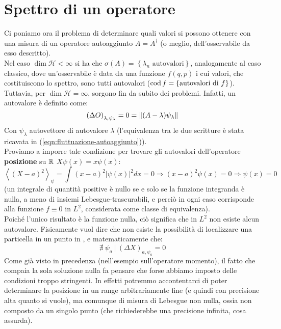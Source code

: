 \documentclass[../../FisicaTeorica.tex]{subfiles}
\begin{document}
\section{Spettro di un operatore}
Ci poniamo ora il problema di determinare quali valori si possono ottenere con una misura di un operatore autoaggiunto $A=A^\dag$ (o meglio, dell'osservabile da esso descritto).\\
Nel caso $\dim{\mathcal{H}}<\infty$ si ha che $\sigma \left(A\right)= \left\{\lambda_n\text{ autovalori}\right\}$, analogamente al caso classico, dove un'osservabile è data da una funzione $f(q,p)$ i cui valori, che costituiscono lo spettro, sono tutti autovalori ($\operatorname{cod} f = \{\text{autovalori di }f\}$).\\
Tuttavia, per $\dim{\mathcal{H}}=\infty$, sorgono fin da subito dei problemi.  Infatti, un autovalore è definito come:
\[
\left(\Delta O\right)_{\lambda,\psi_\lambda}=0 = \left\lVert(A-\lambda)\psi_\lambda\right\rVert
\]
Con $\psi_\lambda$ autovettore di autovalore $\lambda$ 
(l'equivalenza tra le due scritture è stata ricavata in (\ref{eqn:fluttuazione-autoaggiunto})).\\
Proviamo a imporre tale condizione per trovare gli autovalori dell'operatore \textbf{posizione} su $\mathbb{R}$ $X\psi \left(x\right)=x\psi (x)$:
\[
\left\langle\left(X-a\right)^2\right\rangle_\psi=\int \left(x-a\right)^2\left|\psi\left(x\right)\right|^2dx=0\Rightarrow \left(x-a\right)^2\psi \left(x\right)=0\Rightarrow  \psi \left(x\right)=0 
\]
(un integrale di quantità positive è nullo se e solo se la funzione integranda è nulla, a meno di insiemi Lebesgue-trascurabili, e perciò in ogni caso corrisponde alla funzione $f\equiv 0$ in $L^2$, considerata come classe di equivalenza).\\
Poiché l'unico risultato è la funzione nulla, ciò significa che in $L^2$ non esiste alcun autovalore. Fisicamente vuol dire che non esiste la possibilità di localizzare una particella in un punto in \MQ, e matematicamente che:
\[
\nexists\> \psi_a\>|\> \left(\Delta X\right)_{a,\psi_a}=0
\]
Come già visto in precedenza (nell'esempio sull'operatore momento), il fatto che compaia la sola soluzione nulla fa pensare che forse abbiamo imposto delle condizioni troppo stringenti. In effetti potremmo accontentarci di poter determinare la posizione in un range arbitrariamente fine (e quindi con precisione alta quanto si vuole), ma comunque di misura di Lebesgue non nulla, ossia non composto da un singolo punto (che richiederebbe una precisione infinita, cosa assurda).\\
\end{document}
